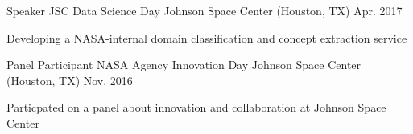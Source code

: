 


\begin{cventries}
  \cventry
    {Speaker} %
    {JSC Data Science Day} %
    {Johnson Space Center (Houston, TX)} %
    {Apr. 2017} %
    {
      \begin{cvitems} %
        \item {Developing a NASA-internal domain classification and concept extraction service}
      \end{cvitems}
    }

  \cventry
    {Panel Participant} %
    {NASA Agency Innovation Day} %
    {Johnson Space Center (Houston, TX)} %
    {Nov. 2016} %
    {
      \begin{cvitems} %
        \item {Particpated on a panel about innovation and collaboration at Johnson Space Center}
      \end{cvitems}
    }
    
\end{cventries}

